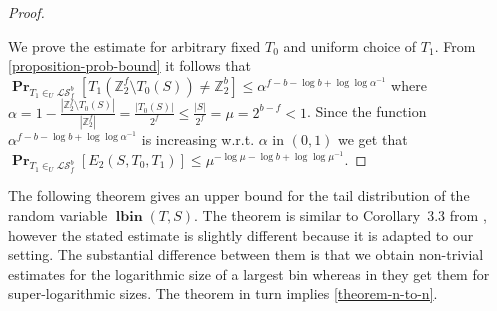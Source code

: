 ﻿\documentclass[review]{elsarticle}
\newcommand{\lbin}[2]{\operatorname{\mathbf{lbin}}({#1}, {#2})}
\newcommand{\vecspace}[2]{\mathbb{Z}_{#1}^{#2}}
\newcommand{\binvecspace}[1]{\vecspace{2}{#1}}
\newcommand{\surjectivelinearmaps}[2]{\mathcal{LS}_{#1}^{#2}}
\newcommand{\probs}[2]{\operatorname{\mathbf{Pr}}_{{#1}}\left[{#2}\right]}
\begin{document}
\begin{proof}
\begin{figure}[h]
\begin{center}
\end{center}
\end{figure}

We prove the estimate for arbitrary fixed $T_0$ and uniform choice of $T_1$.
From \cref{proposition-prob-bound} it follows that $\probs{T_1\in_U \surjectivelinearmaps{f}{b}}{T_1(\binvecspace{f} \setminus T_0(S)) \neq \binvecspace{b}} \leq \alpha ^ {f - b - \log b + \log \log \alpha^{-1}}$ where $\alpha = 1 - \frac{|\binvecspace{f} \setminus T_0(S)|}{|\binvecspace{f}|} = \frac{|T_0(S)|}{2^f} \leq \frac{|S|}{2^f} = \mu = 2^{b - f} < 1$.
Since the function $\alpha ^ {f - b - \log b + \log \log \alpha^{-1}}$ is increasing w.r.t. $\alpha$ in $(0, 1)$ we get that
$
\probs{T_1 \in_U \surjectivelinearmaps{f}{b}}{E_2(S, T_0, T_1)} \leq \mu ^ {-\log \mu - \log b + \log \log \mu^{-1}}.
$
\end{proof}

The following theorem gives an upper bound for the tail distribution of the random variable $\lbin{T}{S}$.
The theorem is similar to Corollary~3.3 from \cite{alonetal}, however the stated estimate is slightly different because it is adapted to our setting.
The substantial difference between them is that we obtain non-trivial estimates for the logarithmic size of a largest bin whereas in \cite{alonetal} they get them for super-logarithmic sizes.
The theorem in turn implies \cref{theorem-n-to-n}.
\end{document}
